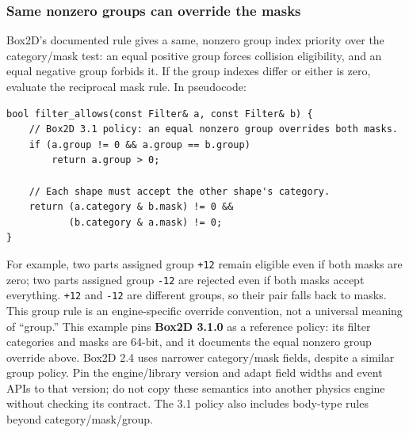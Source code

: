 \subsubsection{Same nonzero groups can override the masks}\label{05-engine-i-ch017-same-nonzero-groups-can-override-the-masks}

Box2D's documented rule gives a same, nonzero group index priority over the category/mask test: an equal positive group forces collision eligibility, and an equal negative group forbids it. If the group indexes differ or either is zero, evaluate the reciprocal mask rule. In pseudocode:

\begin{verbatim}
bool filter_allows(const Filter& a, const Filter& b) {
    // Box2D 3.1 policy: an equal nonzero group overrides both masks.
    if (a.group != 0 && a.group == b.group)
        return a.group > 0;

    // Each shape must accept the other shape's category.
    return (a.category & b.mask) != 0 &&
           (b.category & a.mask) != 0;
}
\end{verbatim}

For example, two parts assigned group \texttt{+12} remain eligible even if both masks are zero; two parts assigned group \texttt{-12} are rejected even if both masks accept everything. \texttt{+12} and \texttt{-12} are different groups, so their pair falls back to masks. This group rule is an engine-specific override convention, not a universal meaning of ``group.'' This example pins \textbf{Box2D 3.1.0} as a reference policy: its filter categories and masks are 64-bit, and it documents the equal nonzero group override above. Box2D 2.4 uses narrower category/mask fields, despite a similar group policy. Pin the engine/library version and adapt field widths and event APIs to that version; do not copy these semantics into another physics engine without checking its contract. The 3.1 policy also includes body-type rules beyond category/mask/group.

